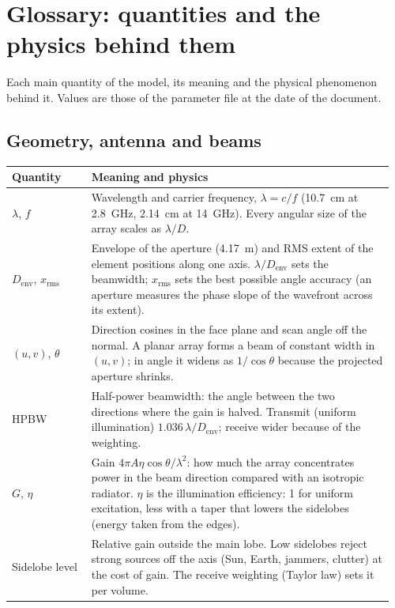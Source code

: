\documentclass[11pt,a4paper]{article}
\newcommand{\Denv}{D_{\mathrm{env}}}
\begin{document}
\section{Glossary: quantities and the physics behind them}\label{sec:glossary}
Each main quantity of the model, its meaning and the physical phenomenon behind it. Values are those of the
parameter file at the date of the document.

\subsection{Geometry, antenna and beams}
{\small
\begin{longtable}{@{}p{0.2\linewidth}p{0.76\linewidth}@{}}
\toprule
Quantity & Meaning and physics\\
\midrule
\endhead
$\lambda$, $f$ & Wavelength and carrier frequency, $\lambda = c/f$ (\SI{10.7}{cm} at \SI{2.8}{GHz}, \SI{2.14}{cm} at
\SI{14}{GHz}). Every angular size of the array scales as $\lambda/D$.\\
$\Denv$, $x_{\mathrm{rms}}$ & Envelope of the aperture (\SI{4.17}{m}) and RMS extent of the element positions along one
axis. $\lambda/\Denv$ sets the beamwidth; $x_{\mathrm{rms}}$ sets the best possible angle accuracy (an aperture
measures the phase slope of the wavefront across its extent).\\
$(u, v)$, $\theta$ & Direction cosines in the face plane and scan angle off the normal. A planar array forms a beam of
constant width in $(u,v)$; in angle it widens as $1/\cos\theta$ because the projected aperture shrinks.\\
HPBW & Half-power beamwidth: the angle between the two directions where the gain is halved. Transmit (uniform
illumination) $1.036\,\lambda/\Denv$; receive wider because of the weighting.\\
$G$, $\eta$ & Gain $4\pi A\eta\cos\theta/\lambda^2$: how much the array concentrates power in the beam direction
compared with an isotropic radiator. $\eta$ is the illumination efficiency: 1 for uniform excitation, less with a
taper that lowers the sidelobes (energy taken from the edges).\\
Sidelobe level & Relative gain outside the main lobe. Low sidelobes reject strong sources off the axis (Sun, Earth,
jammers, clutter) at the cost of gain. The receive weighting (Taylor law) sets it per volume.\\

\end{longtable}}
\end{document}
